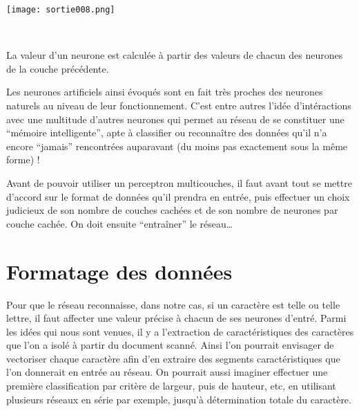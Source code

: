 
\begin{center}
	
	\texttt{[image: sortie008.png]}\\
	\caption{\emph{Perceptron \`a une sortie}}\\
\end{center}





La valeur d'un neurone est calcul\'ee \`a partir des valeurs de chacun
des neurones de la couche pr\'ec\'edente.

Les neurones artificiels ainsi \'evoqu\'es sont en fait tr\`es proches
des neurones naturels au niveau de leur fonctionnement. C'est entre
autres l'id\'ee d'int\'eractions avec une multitude d'autres neurones
qui permet au r\'eseau de se constituer une ``m\'emoire intelligente'',
apte \`a classifier ou reconna\^itre des donn\'ees qu'il n'a encore
``jamais'' rencontr\'ees auparavant (du moins pas exactement sous la
même forme) !

Avant de pouvoir utiliser un perceptron multicouches, il faut avant tout se mettre d'accord sur le
format de donn\'ees qu'il prendra en entr\'ee, puis effectuer un choix
judicieux de son nombre de couches cach\'ees et de son nombre de neurones
par couche cach\'ee. On doit ensuite ``entra\^iner'' le r\'eseau\ldots


\section{Formatage des donn\'ees} %
\label{subsec:formatage_des_donnees}

Pour que le r\'eseau reconnaisse, dans notre cas, si un caract\`ere est
telle ou telle lettre, il faut affecter une valeur pr\'ecise à chacun de
ses neurones d'entr\'e.
Parmi les id\'ees qui nous sont venues, il y a l'extraction de
caract\'eristiques des caract\`eres que l'on a isol\'e \`a partir du document
scann\'e. Ainsi l'on pourrait envisager de vectoriser chaque caract\`ere
afin d'en extraire des segments caract\'eristiques que l'on donnerait en
entr\'ee au r\'eseau. On pourrait aussi imaginer effectuer une premi\`ere
classification par crit\`ere de largeur, puis de hauteur, etc, en utilisant
plusieurs r\'eseaux en s\'erie par exemple, jusqu'\`a d\'etermination totale du
caract\`ere.

